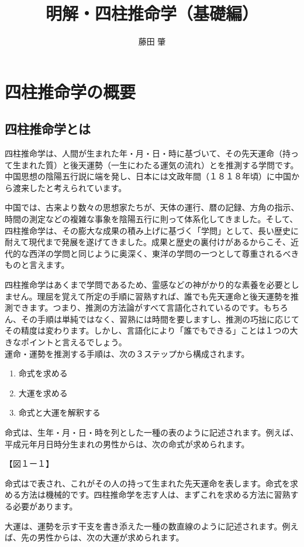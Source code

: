 \documentclass[a4paper,11pt,twocolumn,dvipdfmx]{tarticle}
\title{明解・四柱推命学（基礎編）}
\author{藤田 肇}
\begin{document}

\section{四柱推命学の概要}
\subsection{四柱推命学とは}

四柱推命学は、人間が生まれた年・月・日・時に基づいて、その先天運命（持って生まれた質）と後天運勢（一生にわたる運気の流れ）とを推測する学問です。中国思想の陰陽五行説に端を発し、日本には文政年間（１８１８年頃）に中国から渡来したと考えられています。

中国では、古来より数々の思想家たちが、天体の運行、暦の記録、方角の指示、時間の測定などの複雑な事象を陰陽五行に則って体系化してきました。そして、四柱推命学は、その膨大な成果の積み上げに基づく「学問」として、長い歴史に耐えて現代まで発展を遂げてきました。成果と歴史の裏付けがあるからこそ、近代的な西洋の学問と同じように奥深く、東洋の学問の一つとして尊重されるべきものと言えます。

四柱推命学はあくまで学問であるため、霊感などの神がかり的な素養を必要としません。理屈を覚えて所定の手順に習熟すれば、誰でも先天運命と後天運勢を推測できます。つまり、推測の方法論がすべて言語化されているのです。もちろん、その手順は単純ではなく、習熟には時間を要しますし、推測の巧拙に応じてその精度は変わります。しかし、言語化により「誰でもできる」ことは１つの大きなポイントと言えるでしょう。\\

運命・運勢を推測する手順は、次の３ステップから構成されます。
\begin{enumerate}
\item 命式を求める
\item 大運を求める
\item 命式と大運を解釈する
\end{enumerate}

命式は、生年・月・日・時を列とした一種の表のように記述されます。例えば、平成元年月日時分生まれの男性からは、次の命式が求められます。

【図１ー１】

命式はで表され、これがその人の持って生まれた先天運命を表します。命式を求める方法は機械的です。四柱推命学を志す人は、まずこれを求める方法に習熟する必要があります。

大運は、運勢を示す干支を書き添えた一種の数直線のように記述されます。例えば、先の男性からは、次の大運が求められます。
\end{document}
